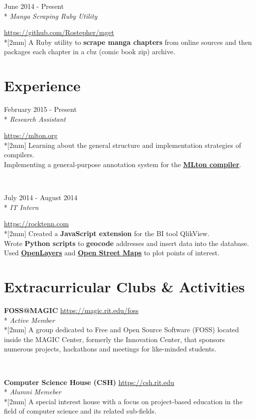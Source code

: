\documentclass[a4paper,margin,line]{resume}
\newcommand{\rvspace}{2mm} %
\newcommand{\rurl}[1]{\hfill {\footnotesize \url{#1}}}
\newcommand{\rdate}[1]{\hfill {\small #1}}
\newcommand{\rdescription}[1]{\small #1 \normalsize}
\newcommand{\ritem}[5] {
    \item[#1]                               %
    \hfill \rdate{#2} \\*                   %
    \hfill {\small \emph{#3}}               %
    \strut \hfill \rurl{#4} \\*[\rvspace]   %
    \rdescription{#5}                       %
}
\newcommand{\remployer}{\ritem}
\newcommand{\rproject}{\ritem}
\newcommand{\rorganization}[4] {
    \item{\bf #1}                           %
    \rurl{#2} \\*                           %
    \hfill {\small \emph{#3}} \\*[\rvspace] %
    \rdescription{#4}                       %
}
\begin{document}
\begin{resume}
\begin{asparadesc}
        \rproject {mget}
                  {June 2014 - Present}
                  {Manga Scraping Ruby Utility}
                  {https://github.com/Rostepher/mget}
        {
            A Ruby utility to {\bf scrape manga chapters} from online sources
            and then packages each chapter in a cbz (comic book zip) archive.
        }
    \end{asparadesc}

\section{\mysidestyle Experience}
	\begin{asparadesc}
        \remployer {Rochester Institute of Technology}
                   {February 2015 - Present}
                   {Research Assistant}
                   {https://mlton.org}
        {
            Learning about the general structure and implementation strategies
            of compilers.\\
            Implementing a general-purpose annotation system for the
            \href{https://mlton.org}{\bf MLton compiler}.
        }
        \\

        \remployer {RockTenn}
                   {July 2014 - August 2014}
                   {IT Intern}
                   {https://rocktenn.com}
        {
            Created a {\bf JavaScript extension} for the BI tool QlikView.\\
            Wrote {\bf Python scripts} to {\bf geocode} addresses and insert
            data into the database.\\
            Used \href{https://openlayers.org}{\bf OpenLayers} and
            \href{https://openstreetmap.org}{\bf Open Street Maps} to plot points
            of interest.
	    }
    \end{asparadesc}

\section{\mysidestyle Extracurricular Clubs \& Activities}
	\begin{asparablank}
        \rorganization {FOSS@MAGIC}
                       {https://magic.rit.edu/foss}
                       {Active Member}
        {
            A group dedicated to Free and Open Source Software (FOSS) located
            inside the MAGIC Center, formerly the Innovation Center, that
            sponsors numerous projects, hackathons and meetings for like-minded
            students.
        }
        \\

        \rorganization {Computer Science House ({\small CSH})}
                       {https://csh.rit.edu}
                       {Alumni Memeber}
        {
            A special interest house with a focus on project-based education in
            the field of computer science and its related sub-fields.
        }
    \end{asparablank}
\end{resume}
\end{document}
